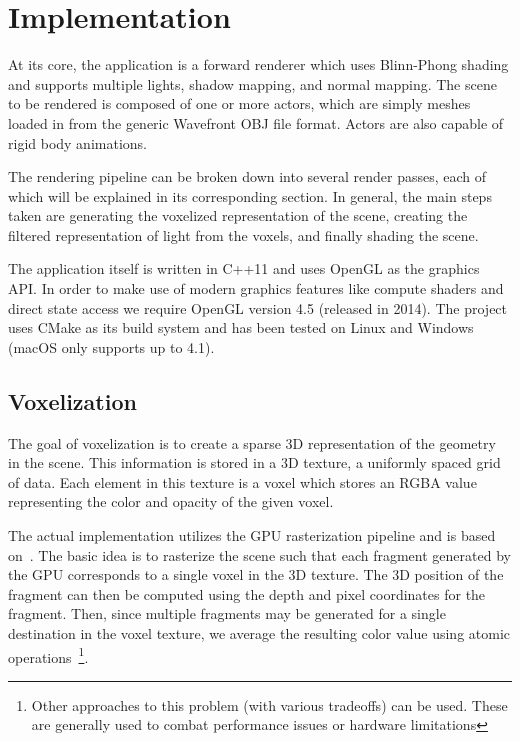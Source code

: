 \chapter{Implementation}

At its core, the application is a forward renderer which uses Blinn-Phong shading and supports multiple lights, shadow mapping, and normal mapping. The scene to be rendered is composed of one or more actors, which are simply meshes loaded in from the generic Wavefront OBJ file format. Actors are also capable of rigid body animations.

The rendering pipeline can be broken down into several render passes, each of which will be explained in its corresponding section. In general, the main steps taken are generating the voxelized representation of the scene, creating the filtered representation of light from the voxels, and finally shading the scene.

The application itself is written in C++11 and uses OpenGL as the graphics API. In order to make use of modern graphics features like compute shaders and direct state access we require OpenGL version 4.5 (released in 2014). The project uses CMake as its build system and has been tested on Linux and Windows (macOS only supports up to 4.1).

\section{Voxelization}
The goal of voxelization is to create a sparse 3D representation of the geometry in the scene. This information is stored in a 3D texture, a uniformly spaced grid of data. Each element in this texture is a voxel which stores an RGBA value representing the color and opacity of the given voxel.

The actual implementation utilizes the GPU rasterization pipeline and is based on~\cite{crassin12}. The basic idea is to rasterize the scene such that each fragment generated by the GPU corresponds to a single voxel in the 3D texture. The 3D position of the fragment can then be computed using the depth and pixel coordinates for the fragment. Then, since multiple fragments may be generated for a single destination in the voxel texture, we average the resulting color value using atomic operations~\footnote{Other approaches to this problem (with various tradeoffs) can be used. These are generally used to combat performance issues or hardware limitations}.

